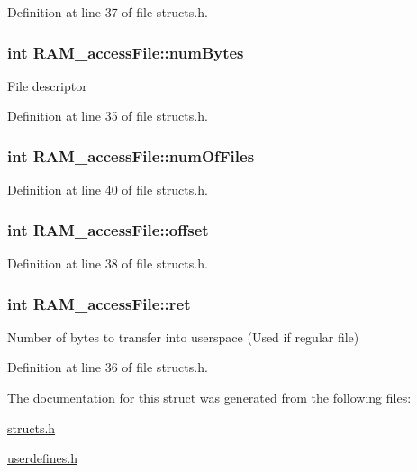 Definition at line 37 of file structs.\-h.

\hypertarget{struct_r_a_m__access_file_adcdf87bed2c5050b88e5504845f7e8d5}{
\subsubsection[{num\-Bytes}]{\setlength{\rightskip}{0pt plus 5cm}int R\-A\-M\-\_\-access\-File\-::num\-Bytes}}\label{struct_r_a_m__access_file_adcdf87bed2c5050b88e5504845f7e8d5}
File descriptor 

Definition at line 35 of file structs.\-h.

\hypertarget{struct_r_a_m__access_file_af11f473315810e213ebba52da9279195}{
\subsubsection[{num\-Of\-Files}]{\setlength{\rightskip}{0pt plus 5cm}int R\-A\-M\-\_\-access\-File\-::num\-Of\-Files}}\label{struct_r_a_m__access_file_af11f473315810e213ebba52da9279195}


Definition at line 40 of file structs.\-h.

\hypertarget{struct_r_a_m__access_file_aabb72f7eb0128f37b67198c536d7cd77}{
\subsubsection[{offset}]{\setlength{\rightskip}{0pt plus 5cm}int R\-A\-M\-\_\-access\-File\-::offset}}\label{struct_r_a_m__access_file_aabb72f7eb0128f37b67198c536d7cd77}


Definition at line 38 of file structs.\-h.

\hypertarget{struct_r_a_m__access_file_a8a6a93cf254de895c2da7d176aa57c5d}{
\subsubsection[{ret}]{\setlength{\rightskip}{0pt plus 5cm}int R\-A\-M\-\_\-access\-File\-::ret}}\label{struct_r_a_m__access_file_a8a6a93cf254de895c2da7d176aa57c5d}
Number of bytes to transfer into userspace (Used if regular file) 

Definition at line 36 of file structs.\-h.



The documentation for this struct was generated from the following files\-:\begin{DoxyCompactItemize}
\item 
\hyperlink{structs_8h}{structs.\-h}\item 
\hyperlink{userdefines_8h}{userdefines.\-h}\end{DoxyCompactItemize}
